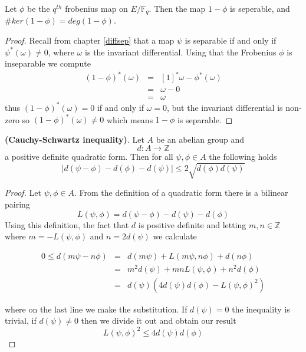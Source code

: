 \begin{thm} \label{frobkernel}
 Let $\phi$ be the $q^{th}$ frobenius map on $E/\mathbb{F}_q$. Then the map $1-\phi$ is seperable, and
$\#ker(1-\phi) = deg(1-\phi)$.
\end{thm}
\begin{proof}
  Recall from chapter \ref{diffsep} that a map $\psi$ is separable if and only if $\psi^*(\omega) \neq 0$,
where $\omega$ is the invariant differential. Using that the Frobenius $\phi$ is inseparable \cite{AEC}
we compute
\begin{eqnarray}
 (1-\phi)^*(\omega) &=& [1]^*\omega - \phi^*(\omega) \nonumber \\
		    &=& \omega - 0 \nonumber \\
		    &=& \omega \nonumber
\end{eqnarray}
thus $(1-\phi)^*(\omega) = 0$ if and only if $\omega = 0$, but the invariant differential is non-zero
so $(1-\phi)^*(\omega) \neq 0$ which means $1-\phi$ is separable.
\end{proof}

\begin{lemma}
 \textbf{(Cauchy-Schwartz inequality)}. Let $A$ be an abelian group and
$$ d: A \rightarrow \mathbb{Z} $$
a positive definite quadratic form. Then for all $\psi, \phi \in A$ the following holds
$$ |d(\psi-\phi)-d(\phi)-d(\psi)| \leq 2 \sqrt{d(\phi)d(\psi)} $$
\end{lemma}
\begin{proof}
 Let $\psi, \phi \in A$. From the definition of a quadratic form there is a bilinear pairing
$$ L(\psi, \phi) = d(\psi-\phi) - d(\psi) - d(\phi) $$
Using this definition, the fact that $d$ is positive definite and letting $m,n \in \mathbb{Z}$ where
$m = -L(\psi, \phi)$ and $n = 2d(\psi)$ we calculate

\begin{eqnarray}
 0 \leq d(m\psi - n\phi) &=& d(m\psi) + L(m\psi, n\phi) + d(n\phi) \nonumber \\
			 &=& m^2 d(\psi) + mnL(\psi,\phi) + n^2 d(\phi) \nonumber \\
			 &=& d(\psi) \left( 4d(\psi)d(\phi)-L(\psi, \phi)^2 \right) \nonumber 
\end{eqnarray}

where on the last line we make the substitution. If $d(\psi)=0$ the inequality is trivial, if
$d(\psi) \neq 0$ then we divide it out and obtain our result
$$L(\psi, \phi)^2 \leq 4d(\psi)d(\phi) $$
\end{proof}

